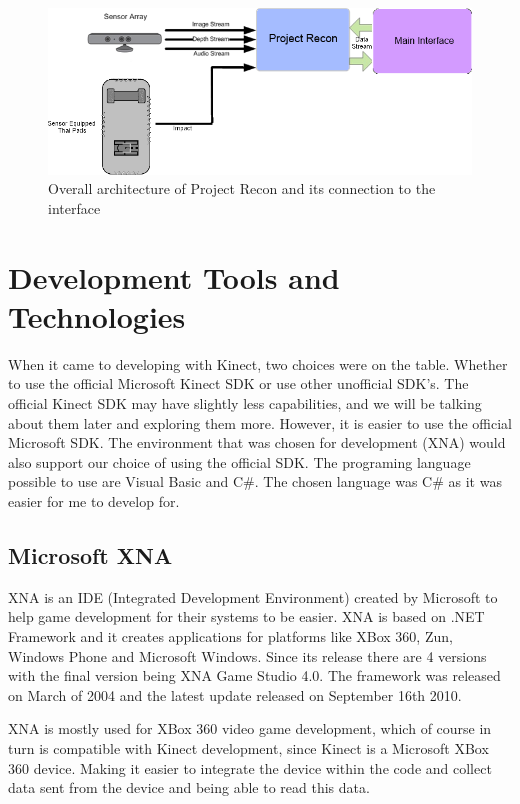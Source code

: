 \begin{figure}[!htbp]
\centering
\includegraphics[width=1\textwidth]{images/general_overview.png}
\caption{Overall architecture of Project Recon and its connection to the interface}
\label{generaloverview}
\end{figure}

\section{Development Tools and Technologies}
When it came to developing with Kinect, two choices were on the table. Whether to use the official Microsoft Kinect SDK or use other unofficial SDK's. The official Kinect SDK may have slightly less capabilities, and we will be talking about them later and exploring them more. However, it is easier to use the official Microsoft SDK. The environment that was chosen for development (XNA) would also support our choice of using the official SDK. The programing language possible to use are Visual Basic and C\#. The chosen language was C\# as it was easier for me to develop for.

\subsection{Microsoft XNA}
XNA is an IDE (Integrated Development Environment) created by Microsoft to help game development for their systems to be easier. XNA is based on .NET Framework and it creates applications for platforms like XBox 360, Zun, Windows Phone and Microsoft Windows. Since its release there are 4 versions with the final version being XNA Game Studio 4.0. The framework was released on March of 2004 and the latest update released on September 16th 2010.

XNA is mostly used for XBox 360 video game development, which of course in turn is compatible with Kinect development, since Kinect is a Microsoft XBox 360 device. Making it easier to integrate the device within the code and collect data sent from the device and being able to read this data.

